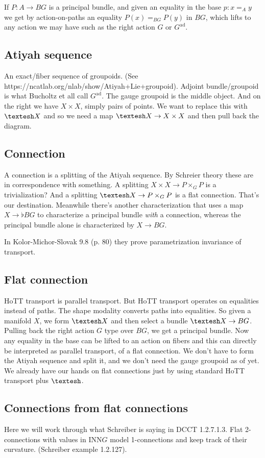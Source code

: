 \documentclass[12pt]{article}
\newcommand{\shape}{\ensuremath{\text{\textesh}}}
\begin{document}
If $P:A\to BG$ is a principal bundle, and given an equality in the base $p: x =_A y$ we get by action-on-paths an equality $P(x)=_{BG}P(y)$ in $BG$, which lifts to any action we may have such as the right action $G$ or $G^{\mathrm{ad}}$.
\subsection{Atiyah sequence}
An exact/fiber sequence of groupoids. (See https://ncatlab.org/nlab/show/Atiyah+Lie+groupoid). Adjoint bundle/groupoid is what Bucholtz et all call $G^{\mathrm{ad}}$. The gauge groupoid is the middle object. And on the right we have $X\times X$, simply pairs of points. We want to replace this with $\shape X$ and so we need a map $\shape X \to X\times X$ and then pull back the diagram.
\subsection{Connection}
A connection is a splitting of the Atiyah sequence. By Schreier theory these are in correspondence with something. A splitting $X\times X \to P\times_G P $ is a trivialization? And a splitting $\shape X \to P\times_G P $ is a flat connection. That's our destination. Meanwhile there's another characterization that uses a map $X\to\flat BG$ to characterize a principal bundle \emph{with} a connection, whereas the principal bundle alone is characterized by $X\to BG$.

In Kolor-Michor-Slovak 9.8 (p. 80) they prove parametrization invariance of transport.
\subsection{Flat connection}
HoTT transport is parallel transport. But HoTT transport operates on equalities instead of paths. The shape modality converts paths into equalities. So given a manifold $X$, we form $\shape X$ and then select a bundle $\shape X \to BG$. Pulling back the right action $G$ type over $BG$, we get a principal bundle. Now any equality in the base can be lifted to an action on fibers and this can directly be interpreted as parallel transport, of a flat connection. We don't have to form the Atiyah sequence and split it, and we don't need the gauge groupoid as of yet. We already have our hands on flat connections just by using standard HoTT transport plus $\shape$.
\subsection{Connections from flat connections}
Here we will work through what Schreiber is saying in DCCT 1.2.7.1.3. Flat 2-connections with values in $\mathrm{INN}G$ model 1-connections and keep track of their curvature. (Schreiber example 1.2.127).
\end{document}
